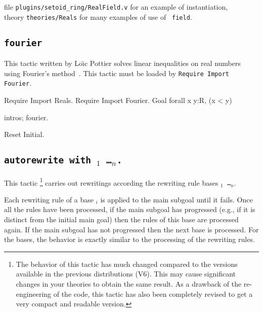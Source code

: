 \begin{coq_example*}
\SeeAlso file {\tt plugins/setoid\_ring/RealField.v} for an example of instantiation,\\
\phantom{\SeeAlso}theory {\tt theories/Reals} for many examples of use of {\tt
field}.

\subsection{\tt fourier
}

This tactic written by Lo{\"\i}c Pottier solves linear inequalities on
real numbers using Fourier's method~\cite{Fourier}. This tactic must
be loaded by {\tt Require Import Fourier}.

\Example
\begin{coq_example*}
Require Import Reals.
Require Import Fourier.
Goal forall x y:R, (x < y)%
\end{coq_example*}

\begin{coq_example}
intros; fourier.
\end{coq_example}

\begin{coq_eval}
Reset Initial.
\end{coq_eval}

\subsection{\tt autorewrite with \ident$_1$ \dots \ident$_n$.
\label{tactic:autorewrite}
}

This tactic \footnote{The behavior of this tactic has much changed compared to
the versions available in the previous distributions (V6). This may cause
significant changes in your theories to obtain the same result. As a drawback
of the re-engineering of the code, this tactic has also been completely revised
to get a very compact and readable version.} carries out rewritings according
the rewriting rule bases {\tt \ident$_1$ \dots \ident$_n$}.

Each rewriting rule of a base \ident$_i$ is applied to the main subgoal until
it fails. Once all the rules have been processed, if the main subgoal has
progressed (e.g., if it is distinct from the initial main goal) then the rules
of this base are processed again. If the main subgoal has not progressed then
the next base is processed. For the bases, the behavior is exactly similar to
the processing of the rewriting rules.


\end{coq_example*}
